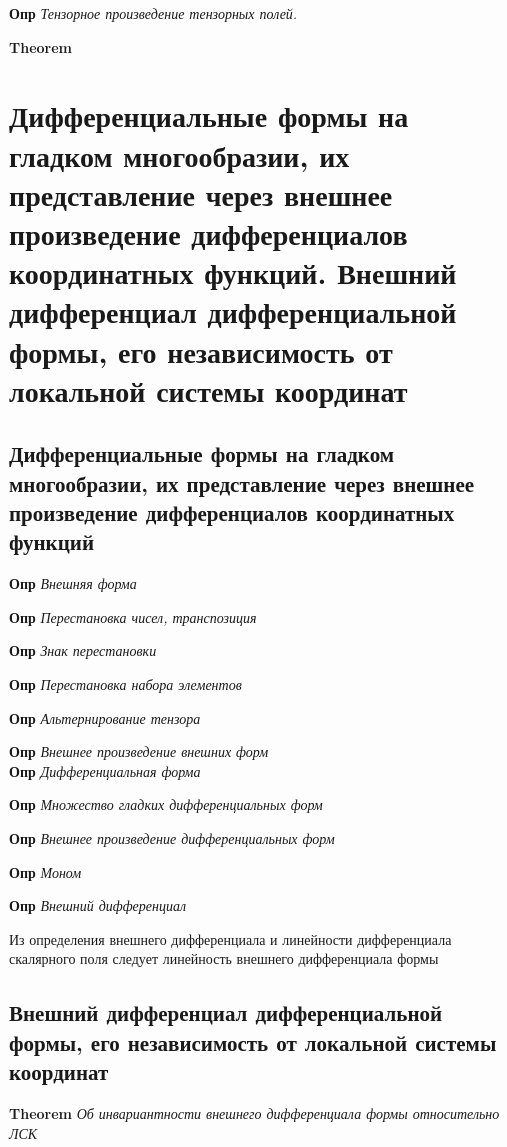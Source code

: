 \documentclass[a4paper, 14pt]{article}
\begin{document}
    \textbf{Опр} \textit{Тензорное произведение тензорных полей.}
    
    \textbf{Theorem}
    
    \section{Дифференциальные формы на гладком многообразии, их представление через внешнее произведение
    дифференциалов координатных функций.
    Внешний дифференциал дифференциальной формы, его независимость от локальной системы координат}
    
    \subsection{Дифференциальные формы на гладком многообразии, их представление через внешнее произведение
    дифференциалов координатных функций}
    
    \textbf{Опр} \textit{Внешняя форма}
    
    \textbf{Опр} \textit{Перестановка чисел, транспозиция}
    
    \textbf{Опр} \textit{Знак перестановки}
    
    \textbf{Опр} \textit{Перестановка набора элементов}
    
    \textbf{Опр} \textit{Альтернирование тензора}
    
    \textbf{Опр} \textit{Внешнее произведение внешних форм} \\
    
    \textbf{Опр} \textit{Дифференциальная форма}
    
    \textbf{Опр} \textit{Множество гладких дифференциальных форм}
    
    \textbf{Опр} \textit{Внешнее произведение дифференциальных форм}
    
    \textbf{Опр} \textit{Моном}
    
    \textbf{Опр} \textit{Внешний дифференциал}
    
    Из определения внешнего дифференциала и линейности дифференциала скалярного поля следует линейность внешнего
    дифференциала формы
    
    \subsection{Внешний дифференциал дифференциальной формы, его независимость от локальной системы координат}
    
    \textbf{Theorem} \textit{Об инвариантности внешнего дифференциала формы относительно ЛСК}
    
\end{document}
